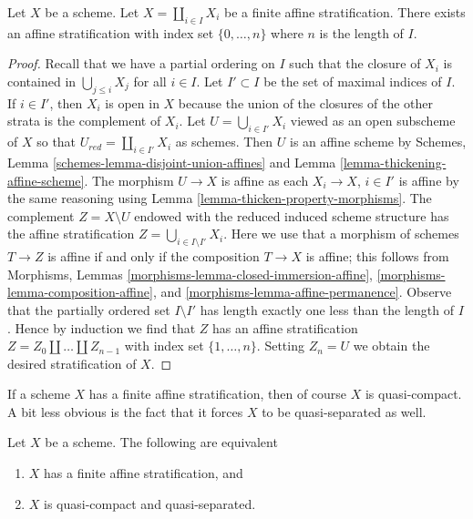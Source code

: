 \begin{lemma}
\label{lemma-improve-stratification}
Let $X$ be a scheme. Let $X = \coprod_{i \in I} X_i$ be a finite
affine stratification. There exists an affine stratification
with index set $\{0, \ldots, n\}$ where $n$ is the length of $I$.
\end{lemma}

\begin{proof}
Recall that we have a partial ordering on $I$ such that
the closure of $X_i$ is contained in $\bigcup_{j \leq i} X_j$
for all $i \in I$.
Let $I' \subset I$ be the set of maximal indices of $I$.
If $i \in I'$, then $X_i$ is open in $X$ because the union of the
closures of the other strata is the complement of $X_i$.
Let $U = \bigcup_{i \in I'} X_i$ viewed as an open subscheme of $X$
so that $U_{red} = \coprod_{i \in I'} X_i$ as schemes.
Then $U$ is an affine scheme by
Schemes, Lemma \ref{schemes-lemma-disjoint-union-affines}
and Lemma \ref{lemma-thickening-affine-scheme}. The morphism $U \to X$
is affine as each $X_i \to X$, $i \in I'$ is affine by the same reasoning
using Lemma \ref{lemma-thicken-property-morphisms}.
The complement $Z = X \setminus U$ endowed with the
reduced induced scheme structure has the affine
stratification $Z = \bigcup_{i \in I \setminus I'} X_i$.
Here we use that a morphism of schemes $T \to Z$ is affine
if and only if the composition $T \to X$ is affine; this follows
from Morphisms, Lemmas \ref{morphisms-lemma-closed-immersion-affine},
\ref{morphisms-lemma-composition-affine}, and
\ref{morphisms-lemma-affine-permanence}.
Observe that the partially ordered set $I \setminus I'$
has length exactly one less than the length of $I$.
Hence by induction we find that $Z$ has an affine
stratification $Z = Z_0 \amalg \ldots \amalg Z_{n - 1}$
with index set $\{1, \ldots, n\}$. Setting $Z_n = U$
we obtain the desired stratification of $X$.
\end{proof}

\noindent
If a scheme $X$ has a finite affine stratification, then
of course $X$ is quasi-compact. A bit less obvious is the
fact that it forces $X$ to be quasi-separated as well.

\begin{lemma}
\label{lemma-qc-affine-stratification}
Let $X$ be a scheme. The following are equivalent
\begin{enumerate}
\item $X$ has a finite affine stratification, and
\item $X$ is quasi-compact and quasi-separated.
\end{enumerate}
\end{lemma}

